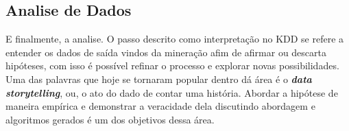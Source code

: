 \subsection{Analise de Dados}
E finalmente, a analise. O passo descrito como interpretação no KDD se refere a entender os dados de saída vindos da mineração afim de afirmar ou descarta hipóteses, com isso é possível refinar o processo e explorar novas possibilidades. Uma das palavras que hoje se tornaram popular dentro dá área é o \textbf{\textit{data storytelling}}, ou, o ato do dado de contar uma história. Abordar a hipótese de maneira empírica e demonstrar a veracidade dela discutindo abordagem e algoritmos gerados é um dos objetivos dessa área.

